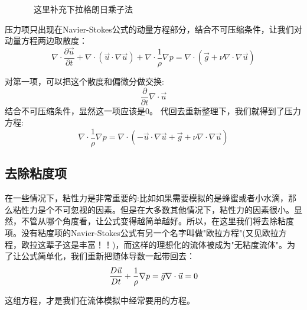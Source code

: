 \documentclass{article}
\begin{document}
~~~~~~~这里补充下拉格朗日乘子法~~~~~~~~~~~~~~~~~~~~~

\par
压力项只出现在Navier-Stokes公式的动量方程部分，结合不可压缩条件，让我们对动量方程两边取散度：
\begin{equation}
\nabla\cdot\frac{\partial{\vec{u}}}{\partial{t}}+\nabla\cdot(\vec{u}\cdot\nabla{\vec{u}})+\nabla\cdot\frac{1}{\rho}\nabla{p}=\nabla\cdot({\vec{g}+\nu\nabla\cdot\nabla\vec{u}})
\end{equation}
\par
对第一项，可以把这个散度和偏微分做交换:
\begin{equation}
\frac{\partial}{\partial{t}}\nabla\cdot\vec{u}
\end{equation}
结合不可压缩条件，显然这一项应该是0。 代回去重新整理下，我们就得到了压力方程:
\begin{equation}
\nabla\cdot\frac{1}{\rho}\nabla{p}=\nabla\cdot(-\vec{u}\cdot\nabla{\vec{u}}+{\vec{g}+\nu\nabla\cdot\nabla\vec{u}})
\end{equation}

\subsection{去除粘度项}
在一些情况下，粘性力是非常重要的:比如如果需要模拟的是蜂蜜或者小水滴，那么粘性力是个不可忽视的因素。但是在大多数其他情况下，粘性力的因素很小。显然，不管从哪个角度看，让公式变得越简单越好。所以，在这里我们将去除粘度项。没有粘度项的Navier-Stokes公式有另一个名字叫做"欧拉方程"(又见欧拉方程，欧拉这辈子这是丰富！！)，而这样的理想化的流体被成为"无粘度流体"。为了让公式简单化，我们重新把随体导数一起带回去：
\begin{equation}
\frac{D\vec{u}}{Dt}+\frac{1}{\rho}\nabla{p}=\vec{g} \\
\nabla\cdot\vec{u}=0
\end{equation}

这组方程，才是我们在流体模拟中经常要用的方程。
\end{document}
